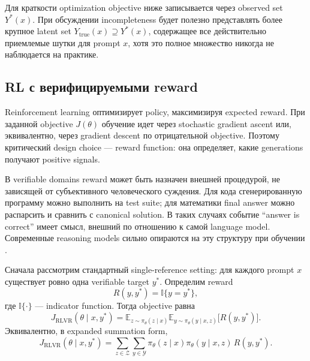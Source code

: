 Для краткости optimization objective ниже записывается через observed set \(Y^{*}(x)\). При обсуждении incompleteness будет полезно представлять более крупное latent set \(Y_{\mathrm{true}}(x)\supseteq Y^{*}(x)\), содержащее все действительно приемлемые шутки для prompt \(x\), хотя это полное множество никогда не наблюдается на практике.

\subsection{RL с верифицируемыми reward}

Reinforcement learning оптимизирует policy, максимизируя expected reward. При заданной objective \(J(\theta)\) обучение идет через stochastic gradient ascent или, эквивалентно, через gradient descent по отрицательной objective. Поэтому критический design choice --- reward function: она определяет, какие generations получают positive signals.

В verifiable domains reward может быть назначен внешней процедурой, не зависящей от субъективного человеческого суждения. Для кода сгенерированную программу можно выполнить на test suite; для математики final answer можно распарсить и сравнить с canonical solution. В таких случаях событие ``answer is correct'' имеет смысл, внешний по отношению к самой language model. Современные reasoning models сильно опираются на эту структуру при обучении \citep{DeepSeek2025,Lightman2023}.

Сначала рассмотрим стандартный single-reference setting: для каждого prompt \(x\) существует ровно одна verifiable target \(y^{*}\). Определим reward
\[
    R(y,y^{*})=\mathbb{I}\{y=y^{*}\},
\]
где \(\mathbb{I}\{\cdot\}\) --- indicator function. Тогда objective равна
\[
    J_{\mathrm{RLVR}}(\theta\mid x,y^{*})
    =
    \mathbb{E}_{z\sim\pi_{\theta}(z\mid x)}
    \mathbb{E}_{y\sim\pi_{\theta}(y\mid x,z)}
    \big[R(y,y^{*})\big].
\]
Эквивалентно, в expanded summation form,
\[
    J_{\mathrm{RLVR}}(\theta\mid x,y^{*})
    =
    \sum_{z\in\mathcal{Z}}\sum_{y\in\mathcal{Y}}
    \pi_{\theta}(z\mid x)\pi_{\theta}(y\mid x,z)\,R(y,y^{*}).
\]

